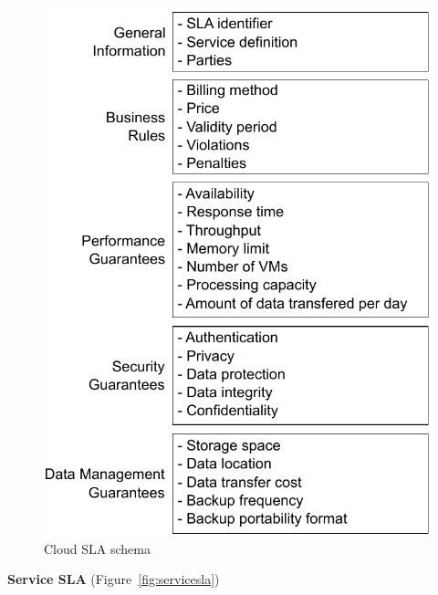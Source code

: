 \documentclass[12pt,a4paper,oneside]{article}
\theoremstyle{definition}
\begin{document}
\begin{figure}[h!]
\center
\includegraphics[scale=1]{figures/Cloud-SLA-Schema.pdf}\caption{Cloud SLA schema}\label{fig:cloudsla}
\end{figure}

\begin{flushleft}
\textbf{Service SLA} (Figure~\ref{fig:servicesla})
\end{flushleft}
\end{document}
